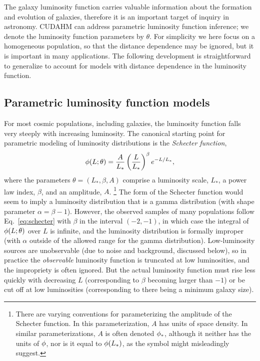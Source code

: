 The galaxy luminosity function carries valuable information about the formation and evolution of galaxies, therefore it is an important target of inquiry in astronomy.
CUDAHM can address parametric luminosity function inference; we denote the luminosity function parameters by $\theta$.
For simplicity we here focus on a homogeneous population, so that the distance dependence may be ignored, but it is important in many applications.
The following development is straightforward to generalize to account for models with distance dependence in the luminosity function.

\subsection{Parametric luminosity function models}
\label{sec:lfmodels}

For most cosmic populations, including galaxies, the luminosity function falls very steeply with increasing luminosity.
The canonical starting point for parametric modeling of luminosity distributions is the \emph{Schecter function},
\begin{equation}
\phi(L;\theta) =
  \frac{A}{L_*} \left(\frac{L}{L_*}\right)^{\beta} e^{-L/L_*},
\label{eq:schecter}
\end{equation}
where the parameters $\theta = (L_*,\beta, A)$ comprise a luminosity scale, $L_*$, a power law index, $\beta$, and an amplitude, $A$.%
\footnote{There are varying conventions for parameterizing the amplitude of the Schecter function.
In this parameterization, $A$ has units of space density.
In similar parameterizations, $A$ is often denoted $\phi_*$, although it neither has the units of $\phi$, nor is it equal to $\phi(L_*)$, as the symbol might misleadingly suggest.}
The form of the Schecter function would seem to imply a luminosity distribution that is a gamma distribution (with shape parameter $\alpha = \beta - 1$).
However, the observed samples of many populations follow Eq.~\ref{eq:schecter} with $\beta$ in the interval $(-2,-1)$, in which case the integral of $\phi(L;\theta)$ over $L$ is infinite, and the luminosity distribution is formally improper (with $\alpha$ outside of the allowed range for the gamma distribution).
Low-luminosity sources are unobservable (due to noise and background, discussed below), so in practice the \emph{observable} luminosity function is truncated at low luminosities, and the impropriety is often ignored.
But the actual luminosity function must rise less quickly with decreasing $L$ (corresponding to $\beta$ becoming larger than $-1$) or be cut off at low luminosities (corresponding to there being a minimum galaxy size).

